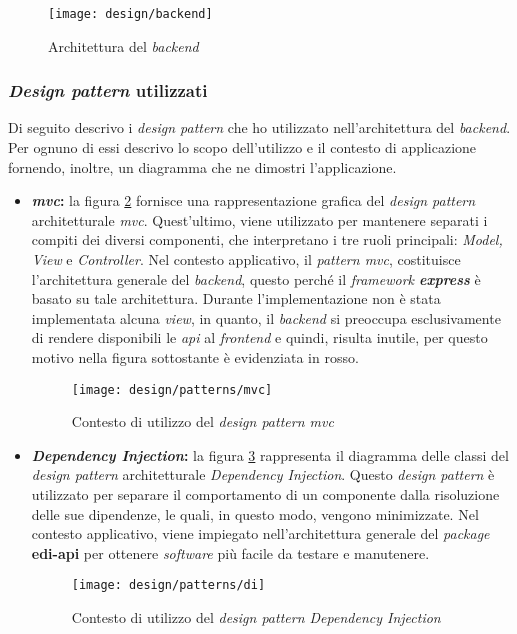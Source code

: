 \begin{figure}[!ht]
  \begin{center}
    \texttt{[image: design/backend]}
    \caption{Architettura del \emph{\gls{backend}}}
    \label{fig:be-design}
  \end{center}
\end{figure}

\subsubsection{\emph{Design pattern} utilizzati}
Di seguito descrivo i \emph{design pattern} che ho utilizzato nell'architettura del \emph{\gls{backend}}. 
Per ognuno di essi descrivo lo scopo dell'utilizzo e il contesto di applicazione fornendo, inoltre, un diagramma che ne dimostri l'applicazione.
\begin{itemize}
  \item \textbf{\emph{\acrlong{mvc}}:} 
  la figura \ref{fig:mvc-pattern} fornisce una rappresentazione grafica del \emph{design pattern} architetturale \emph{\acrshort{mvc}}. Quest'ultimo, viene utilizzato per mantenere separati i compiti dei diversi componenti,
  che interpretano i tre ruoli principali: \emph{Model, View} e \emph{Controller}. Nel contesto applicativo, il \emph{pattern \acrshort{mvc}}, costituisce l'architettura generale del \emph{\gls{backend}}, questo perché il
  \emph{framework \textbf{express}} è basato su tale architettura. Durante l'implementazione non è stata implementata alcuna \emph{view}, in quanto, il \emph{\gls{backend}} si preoccupa esclusivamente di rendere disponibili 
  le \emph{\acrshort{api}} al \emph{\gls{frontend}} e quindi, risulta inutile, per questo motivo nella figura sottostante è evidenziata in rosso.

  \begin{figure}[!ht]
    \begin{center}
      \texttt{[image: design/patterns/mvc]}
      \caption{Contesto di utilizzo del \emph{design pattern \acrshort{mvc}}}
      \label{fig:mvc-pattern}
    \end{center}
  \end{figure}
  \item \textbf{\emph{Dependency Injection}:}
  la figura \ref{fig:di-pattern} rappresenta il diagramma delle classi del \emph{design pattern} architetturale \emph{Dependency Injection}. Questo \emph{design pattern} è utilizzato per separare il comportamento di un componente dalla 
  risoluzione delle sue dipendenze, le quali, in questo modo, vengono minimizzate. Nel contesto applicativo, viene impiegato nell'architettura generale del
  \emph{package} \textbf{edi-api} per ottenere \emph{software} più facile da testare e manutenere. 

  \begin{figure}[!ht]
    \begin{center}
      \texttt{[image: design/patterns/di]}
      \caption{Contesto di utilizzo del \emph{design pattern Dependency Injection}}
      \label{fig:di-pattern}
    \end{center}
  \end{figure}
\end{itemize}

